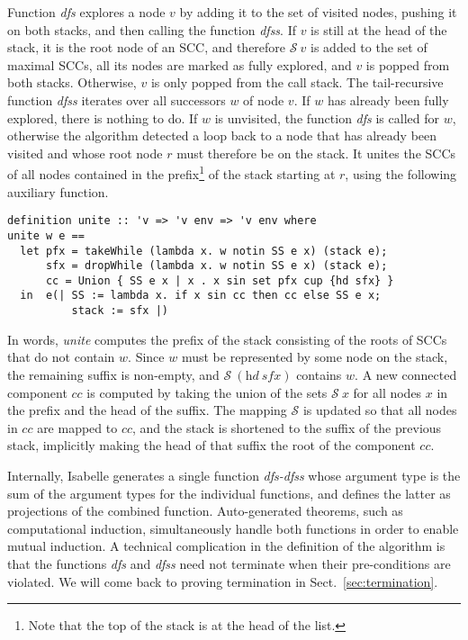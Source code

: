 \documentclass[sigplan,10pt,anonymous,review]{acmart}
\newcommand{\prog}[1]{\textit{#1}}
\renewcommand{\SS}{\mathcal{S}}
\begin{document}
Function \prog{dfs} explores a node $v$ by adding it to the set of visited nodes, pushing it on both stacks, and then calling the function \prog{dfss}. If $v$ is still at the head of the stack, it is the root node of an SCC, and therefore $\SS~v$ is added to the set of maximal SCCs, all its nodes are marked as fully explored, and $v$ is popped from both stacks. Otherwise, $v$ is only popped from the call stack. The tail-recursive function \prog{dfss} iterates over all successors $w$ of node $v$. If $w$ has already been fully explored, there is nothing to do. If $w$ is unvisited, the function \prog{dfs} is called for $w$, otherwise the algorithm detected a loop back to a node that has already been visited and whose root node $r$ must therefore be on the stack. It unites the SCCs of all nodes contained in the prefix\footnote{Note that the top of the stack is at the head of the list.} of the stack starting at $r$, using the following auxiliary function.

\begin{small}
\begin{lstlisting}[language=isabelle]
definition unite :: 'v => 'v env => 'v env where
unite w e ==
  let pfx = takeWhile (lambda x. w notin SS e x) (stack e);
      sfx = dropWhile (lambda x. w notin SS e x) (stack e);
      cc = Union { SS e x | x . x sin set pfx cup {hd sfx} }
  in  e(| SS := lambda x. if x sin cc then cc else SS e x;
          stack := sfx |)
\end{lstlisting}
\end{small}

In words, \prog{unite} computes the prefix of the stack consisting of the roots of SCCs that do not contain $w$. Since $w$ must be represented by some node on the stack, the remaining suffix is non-empty, and $\SS~(\prog{hd}~\prog{sfx})$ contains $w$. A new connected component $\prog{cc}$ is computed by taking the union of the sets $\SS~x$ for all nodes $x$ in the prefix and the head of the suffix. The mapping $\SS$ is updated so that all nodes in $\prog{cc}$ are mapped to $\prog{cc}$, and the stack is shortened to the suffix of the previous stack, implicitly making the head of that suffix the root of the component $cc$.

Internally, Isabelle generates a single function \prog{dfs-dfss} whose argument type is the sum of the argument types for the individual functions, and defines the latter as projections of the combined function. Auto-generated theorems, such as computational induction, simultaneously handle both functions in order to enable mutual induction. A technical complication in the definition of the algorithm is that the functions \prog{dfs} and \prog{dfss} need not terminate when their pre-conditions are violated. We will come back to proving termination in Sect.~\ref{sec:termination}.
\end{document}
